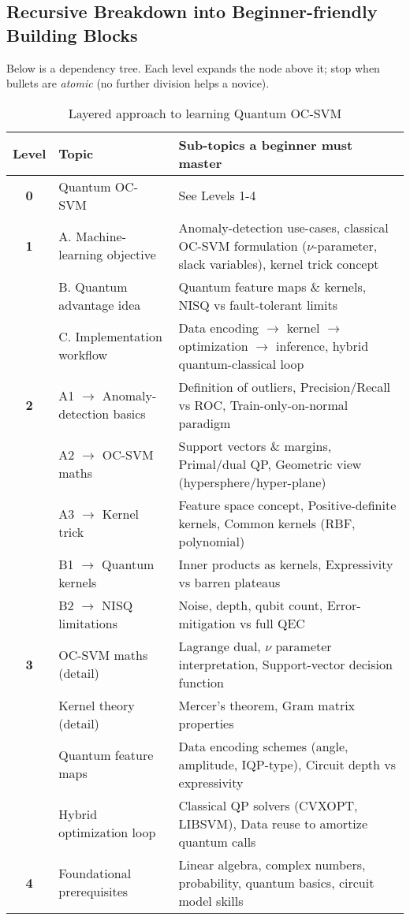 \documentclass[11pt,a4paper]{article}
\begin{document}
	\subsection{Recursive Breakdown into Beginner-friendly Building Blocks}
	
	Below is a dependency tree. Each level expands the node above it; stop when bullets are \emph{atomic} (no further division helps a novice).
	
	\begin{table}[h]
		\centering
		\renewcommand{\arraystretch}{1.2}
		\begin{tabular}{|c|l|l|}
			\hline
			\textbf{Level} & \textbf{Topic} & \textbf{Sub-topics a beginner must master} \\
			\hline
			\textbf{0} & Quantum OC-SVM & See Levels 1-4 \\
			\hline
			\textbf{1} & A. Machine-learning objective & Anomaly-detection use-cases, classical OC-SVM formulation ($\nu$-parameter, slack variables), kernel trick concept \\
			\hline
			& B. Quantum advantage idea & Quantum feature maps \& kernels, NISQ vs fault-tolerant limits \\
			\hline
			& C. Implementation workflow & Data encoding $\rightarrow$ kernel $\rightarrow$ optimization $\rightarrow$ inference, hybrid quantum-classical loop \\
			\hline
			\textbf{2} & A1 $\rightarrow$ Anomaly-detection basics & Definition of outliers, Precision/Recall vs ROC, Train-only-on-normal paradigm \\
			\hline
			& A2 $\rightarrow$ OC-SVM maths & Support vectors \& margins, Primal/dual QP, Geometric view (hypersphere/hyper-plane) \\
			\hline
			& A3 $\rightarrow$ Kernel trick & Feature space concept, Positive-definite kernels, Common kernels (RBF, polynomial) \\
			\hline
			& B1 $\rightarrow$ Quantum kernels & Inner products as kernels, Expressivity vs barren plateaus \\
			\hline
			& B2 $\rightarrow$ NISQ limitations & Noise, depth, qubit count, Error-mitigation vs full QEC \\
			\hline
			\textbf{3} & OC-SVM maths (detail) & Lagrange dual, $\nu$ parameter interpretation, Support-vector decision function \\
			\hline
			& Kernel theory (detail) & Mercer's theorem, Gram matrix properties \\
			\hline
			& Quantum feature maps & Data encoding schemes (angle, amplitude, IQP-type), Circuit depth vs expressivity \\
			\hline
			& Hybrid optimization loop & Classical QP solvers (CVXOPT, LIBSVM), Data reuse to amortize quantum calls \\
			\hline
			\textbf{4} & Foundational prerequisites & Linear algebra, complex numbers, probability, quantum basics, circuit model skills \\
			\hline
		\end{tabular}
		\caption{Layered approach to learning Quantum OC-SVM}
	\end{table}
	
\end{document}
